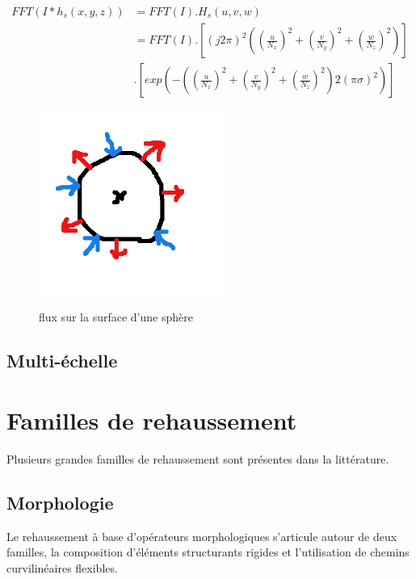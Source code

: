 \begin{align}
  FFT( I * h_s(x,y,z) ) &= FFT(I) . H_s(u,v,w) \\
                       &= FFT(I) . [ (j2 \pi)^2 ( (\frac{u}{N_x})^2 + (\frac{v}{N_y})^2 + (\frac{w}{N_z})^2 ) ] \\
                       & . [ exp( -( (\frac{u}{N_x})^2 + (\frac{v}{N_y})^2 + (\frac{w}{N_z})^2 ) 2(\pi\sigma)^2 ) ]
\end{align}

\begin{figure}
  \centering
  \includegraphics[height=6cm]{Images/flux.png}
  \label{fig:flux_sphere}
  \caption{flux sur la surface d'une sphère}
\end{figure}

\subsection{Multi-échelle}
\label{sec:EA:rehaussement:echelle:multiScale}



\section{Familles de rehaussement}
\label{sec:EA:rehaussement:famille}

Plusieurs grandes familles de rehaussement sont présentes dans la littérature. 

\subsection{Morphologie}
\label{sec:EA:rehaussement:morpho}

Le rehaussement à base d'opérateurs morphologiques s'articule autour de deux familles, la composition d'éléments structurants rigides et l'utilisation de chemins curvilinéaires flexibles.

